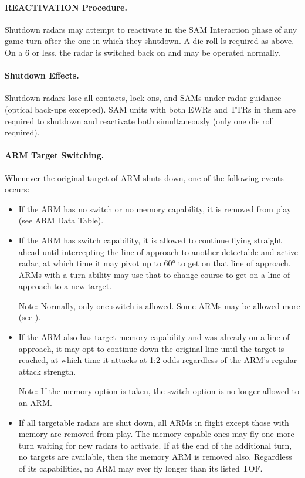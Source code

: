 \paragraph{REACTIVATION Procedure.} Shutdown radars may attempt to reactivate in the SAM Interaction phase of any game-turn after the one in which they shutdown. A die roll ls required as above. On a 6 or less, the radar is switched back on and may be operated normally.

\paragraph{Shutdown Effects.} Shutdown radars lose all contacts, lock-ons, and SAMs under radar guidance (optical back-ups excepted). SAM units with both EWRs and TTRs in them are required to shutdown and reactivate both simultaneously (only one die roll required).

\paragraph{ARM Target Switching.} Whenever the original target of ARM shuts down, one of the following events occurs:

\begin{itemize}

    \item If the ARM has no switch or no memory capability, it is removed from play (see ARM Data Table).

    \item If the ARM has switch capability, it is allowed to continue flying straight ahead until intercepting the line of approach to another detectable and active radar, at which time it may pivot up to 60° to get on that line of approach. ARMs with a turn ability may use that to change course to get on a line of approach to a new target.
    
    Note: Normally, only one switch is allowed.  Some ARMs may be allowed more (see ).

    \item If the ARM also has target memory capability and was already on a line of approach, it may opt to continue down the original line until the target is reached, at which time it attacks at 1:2 odds regardless of the ARM's regular attack strength.

    Note: If the memory option is taken, the switch option is no longer allowed to an ARM.

    \item If all targetable radars are shut down, all ARMs in flight except those with memory are removed from play. The memory capable ones may fly one more turn waiting for new radars to activate. If at the end of the additional turn, no targets are available, then the memory ARM is removed also. Regardless of its capabilities, no ARM may ever fly longer than its listed TOF.

\end{itemize}


